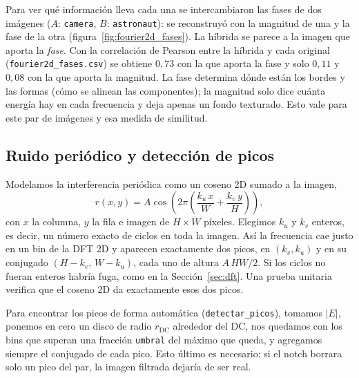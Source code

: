 
Para ver qué información lleva cada una se intercambiaron las fases de dos imágenes ($A$: \texttt{camera},
$B$: \texttt{astronaut}): se reconstruyó con la magnitud de una y la fase de la otra
(figura~\ref{fig:fourier2d_fases}). La híbrida se parece a la imagen que aporta la \emph{fase}. Con la
correlación de Pearson entre la híbrida y cada original (\texttt{fourier2d\_fases.csv}) se obtiene $0{,}73$ con la
que aporta la fase y solo $0{,}11$ y $0{,}08$ con la que aporta la magnitud. La fase determina dónde están
los bordes y las formas (cómo se alinean las componentes); la magnitud solo dice cuánta energía hay en cada
frecuencia y deja apenas un fondo texturado. Esto vale para este par de imágenes y esa medida de similitud.



\subsection{Ruido periódico y detección de picos}
\label{sec:ruido}

Modelamos la interferencia periódica como un coseno 2D sumado a la imagen,
\begin{equation}
  r(x,y) = A\cos\!\left(2\pi\left(\frac{k_u\,x}{W} + \frac{k_v\,y}{H}\right)\right),
  \label{eq:coseno2d}
\end{equation}
con $x$ la columna, $y$ la fila e imagen de $H\times W$ píxeles. Elegimos $k_u$ y $k_v$ enteros,
es decir, un número exacto de ciclos en toda la imagen. Así la frecuencia cae justo en un bin de
la DFT 2D y aparecen exactamente dos picos, en $(k_v, k_u)$ y en su conjugado
$(H-k_v,\,W-k_u)$, cada uno de altura $A\,HW/2$. Si los ciclos no fueran enteros habría fuga, como en la
Sección~\ref{sec:dft}. Una prueba unitaria verifica que el coseno 2D da exactamente esos dos
picos.

Para encontrar los picos de forma automática (\texttt{detectar\_picos}), tomamos $|E|$, ponemos en
cero un disco de radio $r_{\text{DC}}$ alrededor del DC, nos quedamos con los bins que superan una
fracción \texttt{umbral} del máximo que queda, y agregamos siempre el conjugado de cada pico.
Esto último es necesario: si el notch borrara solo un pico del par, la imagen filtrada dejaría
de ser real.

